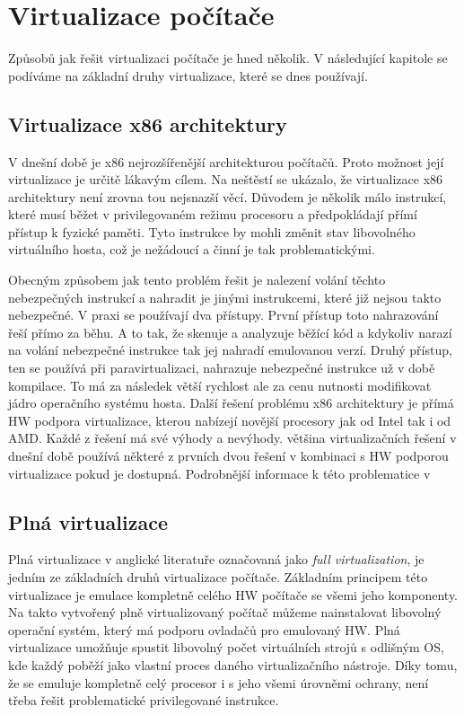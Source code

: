 \section{Virtualizace počítače}
Způsobů jak řešit virtualizaci počítače je hned několik. V následující kapitole se podíváme na základní druhy virtualizace, které se dnes používají.

\subsection{Virtualizace x86 architektury}
V dnešní době je x86 nejrozšířenější architekturou počítačů. Proto možnost její virtualizace je určitě lákavým cílem. Na neštěstí se ukázalo, že virtualizace x86 architektury není zrovna tou nejsnazší věcí. Důvodem je několik málo instrukcí, které musí běžet v privilegovaném režimu procesoru a předpokládají přímí přístup k fyzické paměti. Tyto instrukce by mohli změnit stav libovolného virtuálního hosta, což je nežádoucí a činní je tak problematickými.

Obecným způsobem jak tento problém řešit je nalezení volání těchto nebezpečných instrukcí a nahradit je jinými instrukcemi, které již nejsou takto nebezpečné. V praxi se používají dva přístupy. První přístup toto nahrazování řeší přímo za běhu. A to tak, že skenuje a analyzuje běžící kód a kdykoliv narazí na volání nebezpečné instrukce tak jej nahradí emulovanou verzí. Druhý přístup, ten se používá při paravirtualizaci, nahrazuje nebezpečné instrukce už v době kompilace. To má za následek větší rychlost ale za cenu nutnosti modifikovat jádro operačního systému hosta. Další řešení problému x86 architektury je přímá HW podpora virtualizace, kterou nabízejí novější procesory jak od Intel tak i od AMD. Každé z řešení má své výhody a nevýhody. většina virtualizačních řešení v dnešní době používá některé z prvních dvou řešení v kombinaci s HW podporou virtualizace pokud je dostupná. Podrobnější informace k této problematice v \cite{chisnall:xen}

\subsection{Plná virtualizace}
Plná virtualizace v anglické literatuře označovaná jako \emph{full virtualization}, je jedním ze základních druhů virtualizace počítače. Základním principem této virtualizace je emulace kompletně celého HW počítače se všemi jeho komponenty. Na takto vytvořený plně virtualizovaný počítač můžeme nainstalovat libovolný operační systém, který má podporu ovladačů pro emulovaný HW. Plná virtualizace umožňuje spustit libovolný počet virtuálních strojů s odlišným OS, kde každý poběží jako vlastní proces daného virtualizačního nástroje. Díky tomu, že se emuluje kompletně celý procesor i s jeho všemi úrovněmi ochrany, není třeba řešit problematické privilegované instrukce.
